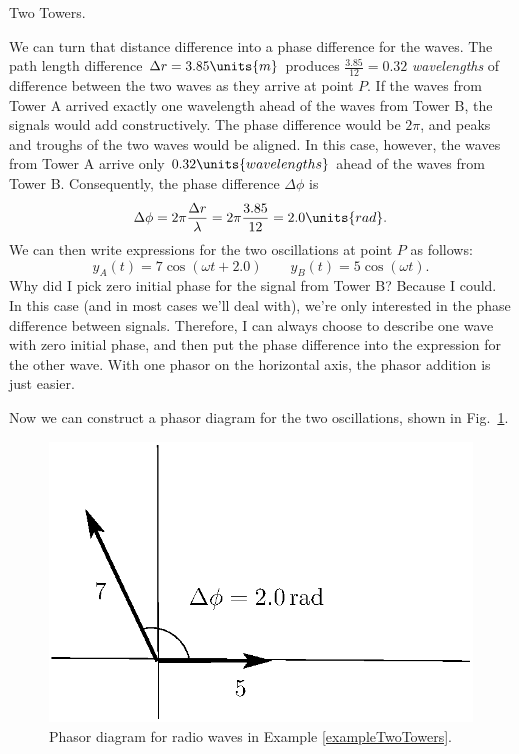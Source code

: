 \begin{exampleb}{Two Towers.}
\begin{solution}
We can turn that distance difference into a phase difference for the
waves. The path length difference $\Delta r = 3.85\units{m}$ produces
$\frac{3.85}{12} = 0.32$ {\em wavelengths} of difference between the two
waves as they arrive at point $P$.
If the waves from Tower A arrived exactly one wavelength ahead of the
waves from Tower B, the signals would add constructively. The phase
difference would be $2\pi$, and peaks and troughs of the two waves
would be aligned. In this case, however, the waves from Tower A arrive
only $0.32\units{wavelengths}$ ahead of the waves from Tower B.
Consequently, the phase difference $\Delta\phi$ is
\begin{equation}
\Delta\phi = 2\pi \frac{\Delta r}{\lambda} = 2\pi \frac{3.85}{12} 
= 2.0\units{rad}.
\end{equation} 
We can then write expressions for the two oscillations at point $P$ as
follows:
\begin{equation}
y_A(t) = 7\cos{\left(\omega t + 2.0\right)} \quad\quad
 y_B(t) = 5\cos{\left(\omega t\right)}.
\end{equation}
Why did I pick zero initial phase for the signal from Tower B?
Because I could. In this case (and in most cases we'll deal with),
we're only interested in the phase difference between signals.
Therefore, I can always choose to describe one wave with zero initial
phase, and then put the phase difference into the expression for the
other wave. With one phasor on the horizontal axis, the phasor
addition is just easier.

Now we can construct a phasor diagram for the two oscillations, shown
in Fig.~\ref{fig:phasor13}.

\begin{figure}\begin{center}
 \includegraphics[width=2.4truein]{phasors/phasor13} 
\caption{\label{fig:phasor13}Phasor diagram for radio waves in 
Example \ref{exampleTwoTowers}.}
\end{center}
\end{figure}


\end{solution}
\end{exampleb}
